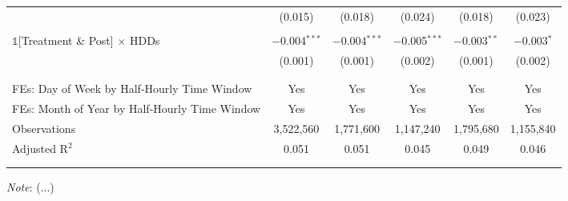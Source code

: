 \begin{table}[!htbp]
\begin{tabular}{@{\extracolsep{10pt}}lccccc}
& (0.015) & (0.018) & (0.024) & (0.018) & (0.023) \\
& & \\
$\mathbb{1}$[Treatment \& Post] $\times$ HDDs & $-$0.004$^{***}$ & $-$0.004$^{***}$ & $-$0.005$^{***}$ & $-$0.003$^{**}$ & $-$0.003$^{*}$ \\
& (0.001) & (0.001) & (0.002) & (0.001) & (0.002) \\
& & \\
\hline
\\[-2.0ex]
FEs: Day of Week by Half-Hourly Time Window & Yes & Yes & Yes & Yes & Yes \\
FEs: Month of Year by Half-Hourly Time Window & Yes & Yes & Yes & Yes & Yes \\
Observations & 3,522,560 & 1,771,600 & 1,147,240 & 1,795,680 & 1,155,840 \\
Adjusted R$^{2}$ & 0.051 & 0.051 & 0.045 & 0.049 & 0.046 \\
\\[-2.0ex]
\hline \hline
\\[-4.5ex]
\end{tabular}
\begin{tablenotes}
    \small
    \textit{Note}: (...)  %
\end{tablenotes}
\label{Table:Breakdown-of-Hourly-ATEs-in-the-Peak-Rate-Period}  %
\end{table}
